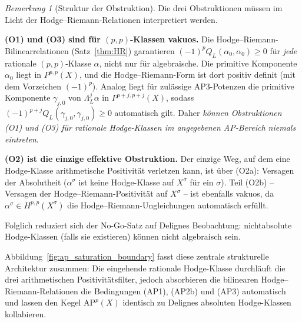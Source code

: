 \documentclass[aps,prd,twocolumn,superscriptaddress,nofootinbib]{revtex4-2}
\theoremstyle{definition}
\theoremstyle{remark}
\newtheorem{remark}[theorem]{Bemerkung}
\begin{document}
\begin{remark}[Struktur der Obstruktion]
\label{rem:obstruction_structure}
Die drei Obstruktionen müssen im Licht der Hodge--Riemann-Relationen interpretiert werden.

\textbf{(O1) und (O3) sind für $(p,p)$-Klassen vakuos.} Die Hodge--Riemann-Bilinearrelationen (Satz~\ref{thm:HR}) garantieren $(-1)^p Q_L(\alpha_0, \alpha_0) \geq 0$ für \textit{jede} rationale $(p,p)$-Klasse $\alpha$, nicht nur für algebraische. Die primitive Komponente $\alpha_0$ liegt in $P^{p,p}(X)$, und die Hodge--Riemann-Form ist dort positiv definit (mit dem Vorzeichen $(-1)^p$). Analog liegt für zulässige AP3-Potenzen die primitive Komponente $\gamma_{j,0}$ von $\Lambda_L^j \alpha$ in $P^{p+j,p+j}(X)$, sodass $(-1)^{p+j} Q_L(\gamma_{j,0}, \gamma_{j,0}) \geq 0$ automatisch gilt. Daher \textit{können Obstruktionen (O1) und (O3) für rationale Hodge-Klassen im angegebenen AP-Bereich niemals eintreten}.

\textbf{(O2) ist die einzige effektive Obstruktion.} Der einzige Weg, auf dem eine Hodge-Klasse arithmetische Positivität verletzen kann, ist über (O2a): Versagen der Absolutheit ($\alpha^\sigma$ ist keine Hodge-Klasse auf $X^\sigma$ für ein $\sigma$). Teil (O2b) -- Versagen der Hodge--Riemann-Positivität auf $X^\sigma$ -- ist ebenfalls vakuos, da $\alpha^\sigma \in H^{p,p}(X^\sigma)$ die Hodge--Riemann-Ungleichungen automatisch erfüllt.

Folglich reduziert sich der No-Go-Satz auf Delignes Beobachtung: nichtabsolute Hodge-Klassen (falls sie existieren) können nicht algebraisch sein.
\end{remark}

Abbildung~\ref{fig:ap_saturation_boundary} fasst diese zentrale strukturelle Architektur zusammen: Die eingehende rationale Hodge-Klasse durchläuft die drei arithmetischen Positivitätsfilter, jedoch absorbieren die bilinearen Hodge--Riemann-Relationen die Bedingungen (AP1), (AP2b) und (AP3) automatisch und lassen den Kegel $\mathrm{AP}^p(X)$ identisch zu Delignes absoluten Hodge-Klassen kollabieren.
\end{document}
